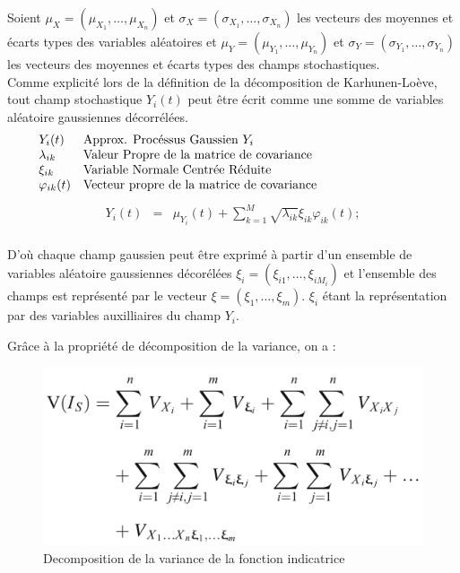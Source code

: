 \documentclass[a4paper,10pt]{article}
\begin{document}
Soient $\mu_{X}=(\mu_{X_{1}},\ldots,\mu_{X_{n}})$ et $\sigma_{X}=(\sigma_{X_{1}},\ldots,\sigma_{X_{n}})$ les vecteurs des moyennes et écarts types des variables aléatoires et $\mu_{Y}=(\mu_{Y_{1}},\ldots,\mu_{Y_{n}})$ et $\sigma_{Y}=(\sigma_{Y_{1}},\ldots,\sigma_{Y_{n}})$ les vecteurs des moyennes et écarts types des champs stochastiques. \\

Comme explicité lors de la définition de la décomposition de Karhunen-Loève, tout champ stochastique $Y_{i}(t)$ peut être écrit comme une somme de variables aléatoire gaussiennes décorrélées. 
\[
	\begin{array}{lp{0.8\linewidth}}
		Y_{i}(t)		& Approx. Procéssus Gaussien $Y_{i}$ \\
		\lambda_{ik}	& Valeur Propre de la matrice de covariance \\
		\xi_{ik}		& Variable Normale Centrée Réduite \\
		\varphi_{ik}(t)	& Vecteur propre de la matrice de covariance
	\end{array}
\]
   \begin{eqnarray}
Y_{i}(t) & = & \mu_{Y_{i}}(t) +  \sum_{k=1}^{M}\sqrt{\lambda_{ik}}\xi_{ik}\varphi_{ik}(t);
   \end{eqnarray}\\

D'où chaque champ gaussien peut être exprimé à partir d'un ensemble de variables aléatoire gaussiennes décorélées $\xi_{i}=(\xi_{i1},\ldots,\xi_{iM_{i}})$ et l'ensemble des champs est représenté par le vecteur $\xi=(\xi_{1},\ldots,\xi_{m})$. $\xi_{i}$ étant la représentation par des variables auxilliaires du champ $Y_{i}$. 

Grâce à la propriété de décomposition de la variance, on a :

\begin{figure}[H]
   \centering   
   \includegraphics[scale=0.175]{DecompositionVariance.png}
      \caption{Decomposition de la variance de la fonction indicatrice}
         \label{VarDecompo}
\end{figure}
\end{document}
